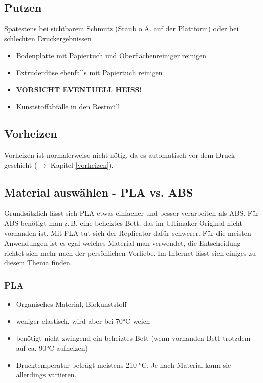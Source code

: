 \documentclass{\basedir/fablab-document}
\begin{document}
\subsection{Putzen} \label{putzen}

Spätestens bei sichtbarem Schmutz (Staub o.Ä. auf der Plattform) oder bei schlechten Druckergebnissen

\begin{itemize}
 \item Bodenplatte mit Papiertuch und Oberflächenreiniger reinigen
 \item Extruderdüse ebenfalls mit Papiertuch reinigen
 \item \textbf{VORSICHT EVENTUELL HEISS!}
 \item Kunststoffabfälle in den Restmüll
\end{itemize}

\subsection{Vorheizen}
Vorheizen ist normalerweise nicht nötig, da es automatisch vor dem Druck geschieht ($\to$ Kapitel \ref{vorheizen}).

\subsection{Material auswählen - PLA vs. ABS}
Grundsätzlich lässt sich PLA etwas einfacher und besser verarbeiten als ABS. Für ABS benötigt man z.\,B. eine beheiztes
Bett, das im Ultimaker Original nicht vorhanden ist. Mit PLA tut sich der Replicator dafür schwerer. Für die meisten
Anwendungen ist es egal welches Material man verwendet, die Entscheidung richtet sich mehr nach der persönlichen
Vorliebe. Im Internet lässt sich einiges zu diesem Thema finden.

\subsubsection{PLA}
\begin{itemize}
\item Organisches Material, Biokunststoff
\item weniger elastisch, wird aber bei 70°C weich
\item benötigt nicht zwingend ein beheiztes Bett (wenn vorhanden Bett trotzdem auf ca. 90°C aufheizen)
\item Drucktemperatur beträgt meistens 210 °C. Je nach Material kann sie allerdings variieren.
\end{itemize}
\end{document}
